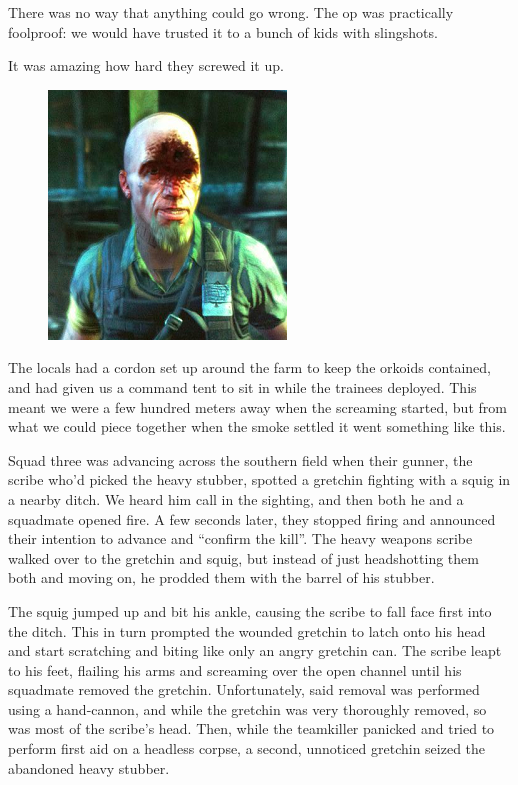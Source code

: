 There was no way that anything could go wrong. 
The op was practically foolproof: 
we would have trusted it to a bunch of kids with slingshots. 


It was amazing how hard they screwed it up.

\begin{figure}
	\begin{center}
		\includegraphics[width=\figwidth]{pics/8/18.png}
	\end{center}
\end{figure}
The locals had a cordon set up around the farm to keep the orkoids contained, and had given us a command tent to sit in while the trainees deployed. 
This meant we were a few hundred meters away when the screaming started, but from what we could piece together when the smoke settled it went something like this.

Squad three was advancing across the southern field when their gunner, the scribe who’d picked the heavy stubber, spotted a gretchin fighting with a squig in a nearby ditch. 
We heard him call in the sighting, and then both he and a squadmate opened fire. 
A few seconds later, they stopped firing and announced their intention to advance and “confirm the kill”. 
The heavy weapons scribe walked over to the gretchin and squig, but instead of just headshotting them both and moving on, he prodded them with the barrel of his stubber.

The squig jumped up and bit his ankle, causing the scribe to fall face first into the ditch. 
This in turn prompted the wounded gretchin to latch onto his head and start scratching and biting like only an angry gretchin can. 
The scribe leapt to his feet, flailing his arms and screaming over the open channel until his squadmate removed the gretchin. 
Unfortunately, said removal was performed using a hand-cannon, and while the gretchin was very thoroughly removed, so was most of the scribe’s head. 
Then, while the teamkiller panicked and tried to perform first aid on a headless corpse, a second, unnoticed gretchin seized the abandoned heavy stubber.


